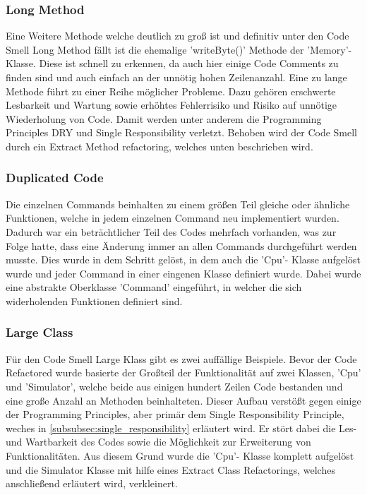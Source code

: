 \documentclass[12pt,a4paper,titlepage,ngerman,pdftex]{report}
\begin{document}
    \subsubsection{Long Method}

    Eine Weitere Methode welche deutlich zu groß ist und definitiv unter den Code Smell Long Method fällt ist die ehemalige 'writeByte()' Methode der 'Memory'- Klasse. Diese ist schnell zu erkennen, da auch hier einige Code Comments zu finden sind und auch einfach an der unnötig hohen Zeilenanzahl.
    Eine zu lange Methode führt zu einer Reihe möglicher Probleme. Dazu gehören erschwerte Lesbarkeit und Wartung sowie erhöhtes Fehlerrisiko und Risiko auf unnötige Wiederholung von Code. Damit werden unter anderem die Programming Principles DRY und Single Responsibility verletzt. 
    Behoben wird der Code Smell durch ein Extract Method refactoring, welches unten beschrieben wird.
    
    \subsubsection{Duplicated Code}\label{subsubsec:duplicated_code}

    Die einzelnen Commands beinhalten zu einem größen Teil gleiche oder ähnliche Funktionen, welche in jedem einzelnen Command neu implementiert wurden. Dadurch war ein beträchtlicher Teil des Codes mehrfach vorhanden, was zur Folge hatte,
    dass eine Änderung immer an allen Commands durchgeführt werden musste. Dies wurde in dem Schritt gelöst, in dem auch die 'Cpu'- Klasse aufgelöst wurde und jeder Command in einer eingenen Klasse definiert wurde. 
    Dabei wurde eine abstrakte Oberklasse 'Command' eingeführt, in welcher die sich widerholenden Funktionen definiert sind.

    \subsubsection{Large Class}
    Für den Code Smell Large Klass gibt es zwei auffällige Beispiele. Bevor der Code Refactored wurde basierte der Großteil der Funktionalität auf zwei Klassen, 'Cpu' und 'Simulator', welche beide aus einigen hundert Zeilen Code bestanden und eine große Anzahl an Methoden beinhalteten.
    Dieser Aufbau verstößt gegen einige der Programming Principles, aber primär dem Single Responsibility Principle, weches in \autoref{subsubsec:single_responsibility} erläutert wird. Er stört dabei die Les- und Wartbarkeit des Codes sowie die Möglichkeit zur Erweiterung von Funktionalitäten.
    Aus diesem Grund wurde die 'Cpu'- Klasse komplett aufgelöst und die  Simulator Klasse mit hilfe eines Extract Class Refactorings, welches anschließend erläutert wird, verkleinert.
\end{document}

